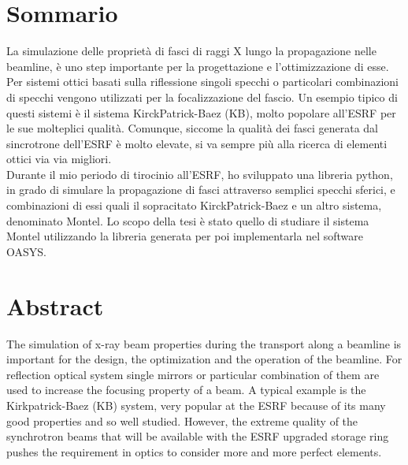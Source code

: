 %
%
\cleardoublepage
%
%
%
\begingroup
\let\cleardoublepage\relax
\let\cleardoublepage\relax
%
\chapter*{Sommario}
%
La simulazione delle proprietà di fasci di raggi X lungo la propagazione nelle beamline,  è uno step importante per la progettazione e l'ottimizzazione di esse. Per sistemi ottici basati sulla riflessione singoli specchi o particolari combinazioni di specchi vengono utilizzati per la focalizzazione del fascio. Un esempio tipico di questi sistemi è il sistema KirckPatrick-Baez (KB), molto popolare all'ESRF per le sue molteplici qualità. Comunque, siccome la qualità dei fasci generata dal sincrotrone dell'ESRF è molto elevate, si va sempre più alla ricerca di elementi ottici via via migliori.
\\
Durante il mio periodo di tirocinio all'ESRF, ho sviluppato una libreria python, in grado di simulare la propagazione di fasci attraverso semplici specchi sferici, e combinazioni di essi quali il sopracitato KirckPatrick-Baez e un altro sistema, denominato Montel. Lo scopo della tesi è stato quello di studiare il sistema Montel utilizzando la libreria generata per poi implementarla nel software OASYS.
\medskip
%
%
\clearpage
%
%
%
%
\chapter*{Abstract}
The simulation of x-ray beam properties during the transport along a beamline is important for the design, the optimization and the operation of the beamline. For reflection optical system single mirrors or particular combination of them are used to increase the focusing property of a beam. A typical example is the Kirkpatrick-Baez (KB) system, very popular at the ESRF because of its many good properties and so well studied. However, the extreme quality of the synchrotron beams that will be available with the ESRF upgraded storage ring pushes the requirement in optics to consider more and more perfect elements.

